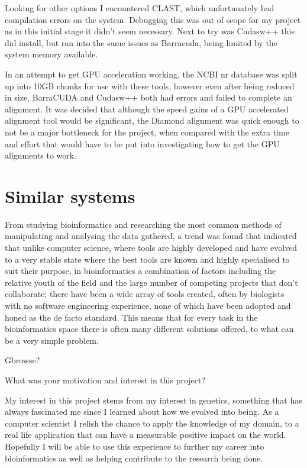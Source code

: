 Looking for other options I encountered CLAST\cite{clast}, which unfortunately had compilation errors on the system. Debugging this was out of scope for my project as in this initial stage it didn't seem necessary. Next to try was Cudasw++\cite{cudasw} this did install, but ran into the same issues as Barracuda, being limited by the system memory available. 

In an attempt to get GPU acceleration working, the NCBI nr database was split up into 10GB chunks for use with these tools, however even after being reduced in size, BarraCUDA and Cudasw++ both had errors and failed to complete an alignment. It was decided that although the speed gains of a GPU accelerated alignment tool would be significant, the Diamond alignment was quick enough to not be a major bottleneck for the project, when compared with the extra time and effort that would have to be put into investigating how to get the GPU alignments to work. 

\section{Similar systems}

From studying bioinformatics and researching the most common methods of manipulating and analysing the data gathered, a trend was found that indicated that unlike computer science, where tools are highly developed and have evolved to a very stable state where the best tools are known and highly specialised to suit their purpose, in bioinformatics a combination of factors including the relative youth of the field and the large number of competing projects that don't collaborate; there have been a wide array of tools created, often by biologists with no software engineering experience, none of which have been adopted and honed as the de facto standard. This means that for every task in the bioinformatics space there is often many different solutions offered, to what can be a very simple problem. 

Gbrowse?

What was your motivation and interest in this project? 

My interest in this project stems from my interest in genetics, something that has always fascinated me since I learned about how we evolved into being. As a computer scientist I relish the chance to apply the knowledge of my domain, to a real life application that can have a measurable positive impact on the world. Hopefully I will be able to use this experience to further my career into bioinformatics as well as helping contribute to the research being done. 


